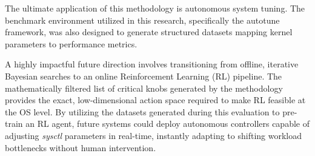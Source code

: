 The ultimate application of this methodology is autonomous system tuning.
The benchmark environment utilized in this research, specifically the autotune framework, was also designed to generate structured datasets mapping kernel parameters to performance metrics.

A highly impactful future direction involves transitioning from offline, iterative Bayesian searches to an online Reinforcement Learning (RL) pipeline.
The mathematically filtered list of critical knobs generated by the methodology provides the exact, low-dimensional action space required to make RL feasible at the OS level.
By utilizing the datasets generated during this evaluation to pre-train an RL agent, future systems could deploy autonomous controllers capable of adjusting \textit{sysctl} parameters in real-time, instantly adapting to shifting workload bottlenecks without human intervention.

\newpage
